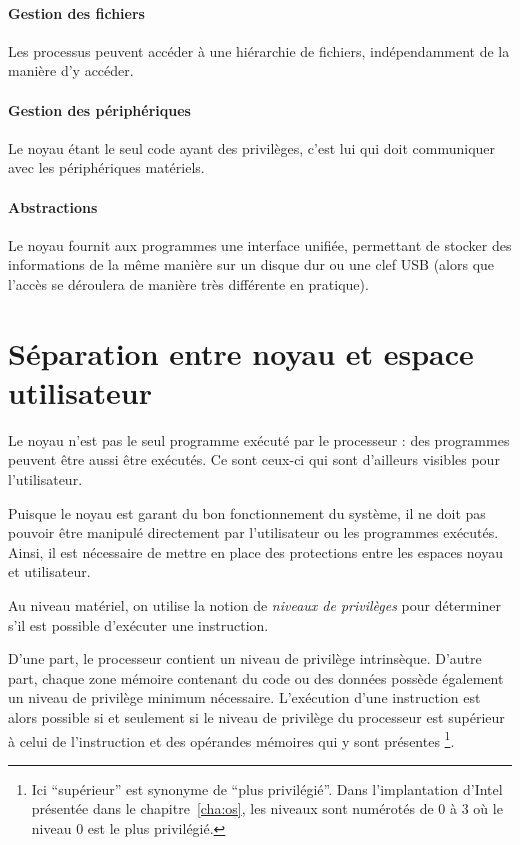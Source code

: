 \paragraph{Gestion des fichiers}

Les processus peuvent accéder à une hiérarchie de fichiers, indépendamment de la
manière d'y accéder.

\paragraph{Gestion des périphériques}

Le noyau étant le seul code ayant des privilèges, c'est lui qui doit communiquer
avec les périphériques matériels.

\paragraph{Abstractions}

Le noyau fournit aux programmes une interface unifiée, permettant de stocker des
informations de la même manière sur un disque dur ou une clef USB (alors que
l'accès se déroulera de manière très différente en pratique).

\section{Séparation entre noyau et espace utilisateur}

Le noyau n'est pas le seul programme exécuté par le processeur : des programmes
peuvent être aussi être exécutés. Ce sont ceux-ci qui sont d'ailleurs visibles
pour l'utilisateur.

Puisque le noyau est garant du bon fonctionnement du système, il ne doit pas
pouvoir être manipulé directement par l'utilisateur ou les programmes exécutés.
Ainsi, il est nécessaire de mettre en place des protections entre les espaces
noyau et utilisateur.

Au niveau matériel, on utilise la notion de \emph{niveaux de privilèges} pour
déterminer s'il est possible d'exécuter une instruction.

D'une part, le processeur contient un niveau de privilège intrinsèque. D'autre
part, chaque zone mémoire contenant du code ou des données possède également un
niveau de privilège minimum nécessaire. L'exécution d'une instruction est alors
possible si et seulement si le niveau de privilège du processeur est supérieur à
celui de l'instruction et des opérandes mémoires qui y sont présentes
\footnote{
  Ici ``supérieur'' est synonyme de ``plus privilégié''. Dans l'implantation
  d'Intel présentée dans le chapitre~\ref{cha:os}, les niveaux sont numérotés de
  0 à 3 où le niveau 0 est le plus privilégié.
}.

